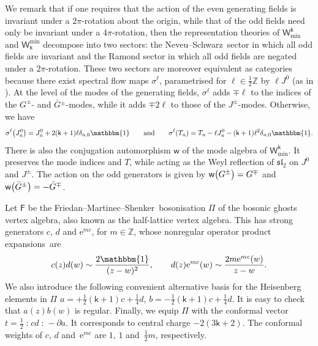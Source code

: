 \documentclass[pdftex]{sigma}
\numberwithin{equation}{section}
\newcommand{\pd}{\partial} %
\newcommand{\wun}{\mathbbm{1}} %
\newcommand{\bG}{\bar{G}{}}
\newcommand{\ee}{\mathrm{e}} %
\newcommand{\kk}{\mathsf{k}} %
\DeclarePairedDelimiter{\brac}{\lparen}{\rparen} %
\newcommand{\no}[1]{\mathopen{:} #1 \mathclose{:}} %
\newcommand{\fld}[1]{\mathbb{#1}} %
\newcommand{\alg}[1]{\mathfrak{#1}} %
\newcommand{\VOA}[1]{\mathsf{#1}} %
\newcommand{\ZZ}{\fld{Z}}
\newcommand{\SLA}[2]{\alg{#1}_{#2}} %
\newcommand{\sltwo}{\SLA{sl}{2}}
\newcommand{\lsymb}{\Pi}
\newcommand{\lvoa}{\lsymb} %
\newcommand{\uwalg}[2]{\VOA{W}^{#1}_{\mathrm{#2}}} %
\newcommand{\swalg}[2]{\VOA{W}_{#1}^{\mathrm{#2}}} %
\newcommand{\umin}[1][\kk]{\uwalg{#1}{min}} %
\newcommand{\smin}[1][\kk]{\swalg{#1}{min}} %
\newcommand{\nconjsymb}{\mathsf{w}} %
\newcommand{\nconj}{\nconjsymb \brac}
\newcommand{\nsfsymb}[1]{\sigma^{#1}} %
\newcommand{\nsf}[1]{\nsfsymb{#1} \brac}
\newcommand{\fms}{Friedan--Martinec--Shenker}
\newcommand{\ns}{Neveu--Schwarz}
\newcommand{\va}{vertex algebra}
\newcommand{\ope}{operator product expansion}
\newcommand{\opes}{\ope s}
\begin{document}
We remark that if one requires that the action of the even generating fields is invariant under a $2\pi$-rotation about the origin, while that of the odd fields need only be invariant under a $4\pi$\nobreakdash-rotation, then the representation theories of $\umin$ and $\smin$ decompose into two sectors: the \ns\ sector in which all odd fields are invariant and the Ramond sector in which all odd fields are negated under a $2\pi$-rotation.
These two sectors are moreover equivalent as categories because there exist spectral flow maps $\nsfsymb{\ell}$, parametrised for $\ell \in \frac{1}{2}\ZZ$ by $\ell J^0$ (as in \cite{LiPhy97}).
At the level of the modes of the generating fields, $\nsfsymb{\ell}$ adds $\mp\ell$ to the indices of the $G^{\pm}$- and $\bG^{\pm}$-modes, while it adds $\mp2\ell$ to those of the $J^{\pm}$-modes.
Otherwise, we have
\begin{equation} \label{eq:N=4sf}
	\nsf{\ell}[\big]{J^0_n} = J^0_n + 2(\kk+1)\ell\delta_{n,0}\wun \qquad \text{and} \qquad
	\nsf{\ell}{T_n} = T_n - \ell J^0_n- (\kk+1)\ell^2\delta_{n,0}\wun.
\end{equation}
There is also the conjugation automorphism $\nconjsymb$ of the mode algebra of $\umin$.
It preserves the mode indices and $T$, while acting as the Weyl reflection of $\sltwo$ on $J^0$ and $J^{\pm}$.
The action on the odd generators is given by
$%
	\nconj[\big]{G^{\pm}} = G^{\mp} $ and $\nconj[\big]{\bG^{\pm}} = -\bG^{\mp}$.

Let $\VOA{F}$ be the \fms\ bosonisation $\lvoa$ of the bosonic ghosts \va, also known as the half-lattice vertex algebra.
This has strong generators $c$, $d$ and $\ee^{mc}$, for $m \in \ZZ$, whose nonregular \opes\ are \cite{FriCon86}
\[
	c(z) d(w) \sim \frac{2 \wun}{(z-w)^2}, \qquad
	d(z) \ee^{mc}(w) \sim \frac{2m \ee^{mc}(w)}{z-w}.
\]
We also introduce the following convenient alternative basis for the Heisenberg elements in $\lvoa$
$a = +\frac{1}{2} (\kk+1)c + \frac{1}{4} d$, $
	b = -\frac{1}{2} (\kk+1)c + \frac{1}{4} d$.
It is easy to check that $a(z) b(w)$ is regular.
Finally, we equip $\lvoa$ with the conformal vector
$t = \frac{1}{2} \no{cd} - \pd a$.
It corresponds to central charge $-2(3\kk+2)$.
The conformal weights of $c$, $d$ and~$\ee^{mc}$ are $1$, $1$ and~$\frac{1}{2}m$, respectively.
\end{document}
